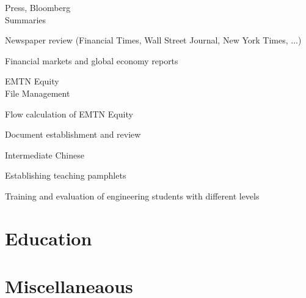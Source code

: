 \documentclass[a4paper,11pt]{cv4tw}%
\begin{document}
	{Press, Bloomberg\\Summaries}
		{
		\begin{missions}
			\item Newspaper review (Financial Times, Wall Street Journal, New York Times, ...)
			\item Financial markets and global economy reports
		\end{missions}
	}


	{EMTN Equity\\File Management}
		{
		\begin{missions}
			\item Flow calculation of EMTN Equity
			\item Document establishment and review
		\end{missions}
	}


	{Intermediate Chinese}
		{
		\begin{missions}
			\item Establishing teaching pamphlets
			\item Training and evaluation of engineering students with different levels
		\end{missions}
	}


	\section{Education}

	\section{Miscellaneaous}
	\begin{skills}{}
	\end{skills}
\end{document}
